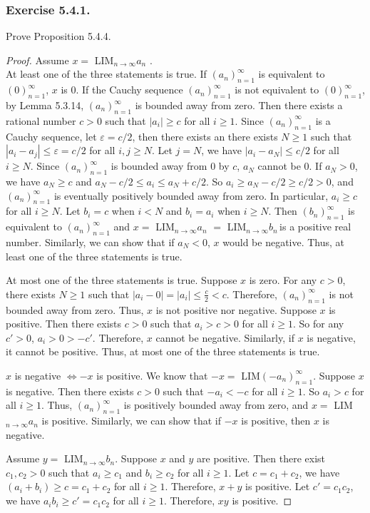 \documentclass[12pt, letter]{article}
\newcommand{\an}{$(a_n)_{n=1}^\infty$ }
\newcommand{\bn}{$(b_n)_{n=1}^\infty$ }
\newcommand{\la}{LIM$_{n\to\infty}a_n$  }
\newcommand{\lb}{LIM$_{n\to\infty}b_n$}
\begin{document}
\subsubsection*{Exercise 5.4.1.}
Prove Proposition 5.4.4.
\begin{proof}
    Assume $x=$ \la. \\
    At least one of the three statements is true. If \an is equivalent to $(0)_{n=1}^\infty$, $x$ is 0. If the Cauchy sequence \an is not equivalent to $(0)_{n=1}^\infty$, 
    by Lemma 5.3.14, \an is bounded away from zero. Then there exists a rational number $c>0$ such that $|a_i|\geq c$ for all $i\geq 1$. Since \an is a Cauchy sequence, 
    let $\varepsilon=c/2$, then there exists an there exists $N\geq 1$ such that $|a_i-a_j|\leq \varepsilon=c/2$ for all $i,j\geq N$. Let $j=N$, we have 
    $|a_i-a_N|\leq c/2$ for all $i\geq N$. Since \an is bounded away from 0 by $c$, $a_N$ cannot be $0$. If $a_N>0$, we have $a_N\geq c$ and $a_N-c/2\leq a_i\leq a_N+c/2$. So $a_i\geq a_N-c/2\geq c/2>0$, and 
    \an is eventually positively bounded away from zero. In particular, $a_i\geq c$ for all $i\geq N$. Let $b_i=c$ when $i< N$ and $b_i=a_i$ when $i\geq N$. Then \bn is equivalent to 
    \an and $x=$ \la $=$ \lb\,is a positive real number. Similarly, we can show that if $a_N<0$, $x$ would be negative. Thus, at least one of the three statements is true.

    At most one of the three statements is true. Suppose $x$ is zero. For any $c>0$, there exists $N\geq 1$ such that $|a_i-0|=|a_i|\leq \frac{c}{2}<c$. Therefore, \an is not bounded away from zero.
    Thus, $x$ is not positive nor negative. Suppose $x$ is positive. Then there exists $c>0$ such that $a_i>c>0$ for all $i\geq 1$. So for any $c'>0$, $a_i>0>-c'$. Therefore, $x$ cannot be negative. 
    Similarly, if $x$ is negative, it cannot be positive. Thus, at most one of the three statements is true.

    $x$ is negative $\iff -x$ is positive. We know that $-x=$ LIM$(-a_n)_{n=1}^\infty$. Suppose $x$ is negative. Then there exists $c>0$ such that $-a_i<-c$ for all $i\geq 1$. 
    So $a_i>c$ for all $i\geq 1$. Thus, \an is positively bounded away from zero, and $x=$ \la is positive. Similarly, we can show that if $-x$ is positive, then $x$ is negative.

    Assume $y=$ \lb. Suppose $x$ and $y$ are positive. Then there exist $c_1,c_2>0$ such that $a_i\geq c_1$ and $b_i\geq c_2$ for all $i\geq 1$. Let $c=c_1+c_2$, we have 
    $(a_i+b_i)\geq c=c_1+c_2$ for all $i\geq 1$. Therefore, $x+y$ is positive. Let $c'=c_1c_2$, we have $a_i b_i\geq c'=c_1c_2$ for all $i\geq 1$. Therefore, $xy$ is positive.
\end{proof}
\end{document}
